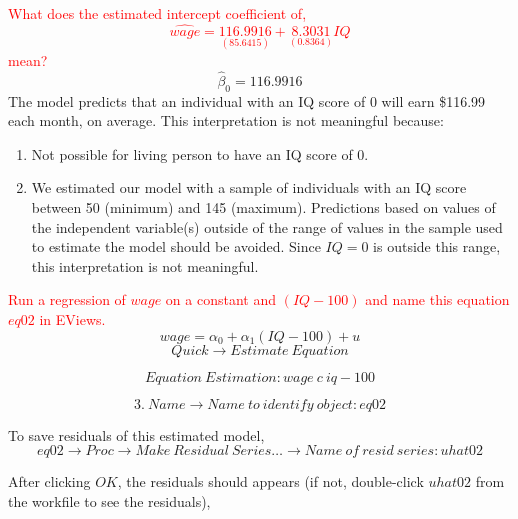 \documentclass[12pt]{report}
\begin{document}
\noindent \textcolor{red}{What does the estimated intercept coefficient of,
$$\widehat{wage} = \underset{(85.6415)}{116.9916} + \underset{(0.8364)}{8.3031}IQ$$ mean?}
$$\hat{\beta}_0 = 116.9916$$
\noindent 	The model predicts that an individual with an IQ score of 0 will earn \$116.99 each month, on average. This interpretation is not meaningful because:
\begin{enumerate}
	\item Not possible for living person to have an IQ score of 0.
	\item We estimated our model with a sample of individuals with an IQ score between 50 (minimum) and 145 (maximum). Predictions based on values of the independent variable(s) outside of the range of values in the sample used to estimate the model should be avoided. Since $IQ = 0$ is outside this range, this interpretation is not meaningful.
\end{enumerate}
\noindent \textcolor{red}{Run a regression of $wage$ on a constant and $(IQ-100)$ and name this equation $eq02$ in EViews.}
$$wage = \alpha_0 + \alpha_1(IQ-100) + u$$
$$Quick \to Estimate\ Equation$$
\begin{figure}[H]
	\centering
\end{figure}
\vspace{-\baselineskip}
$$Equation\ Estimation: wage\ c\ iq-100$$
\begin{figure}[H]
	\centering
\end{figure}
\vspace{-\baselineskip}
$$3.\ Name \to Name\ to\ identify\ object: eq02$$
\begin{figure}[H]
	\centering
\end{figure}
\vspace{-\baselineskip}
\begin{figure}[H]
	\centering
\end{figure}
\vspace{-\baselineskip}
\noindent To save residuals of this estimated model,
$$eq02 \to Proc \to Make\ Residual\ Series \dots \to Name\ of\ resid\ series: uhat02$$
\begin{figure}[H]
	\centering
\end{figure}
\vspace{-\baselineskip}
\begin{figure}[H]
	\centering
\end{figure}
\vspace{-\baselineskip}
\noindent After clicking $OK$, the residuals should appears (if not, double-click $uhat02$ from the workfile to see the residuals),
\begin{figure}[H]
	\centering
\end{figure}
\end{document}
